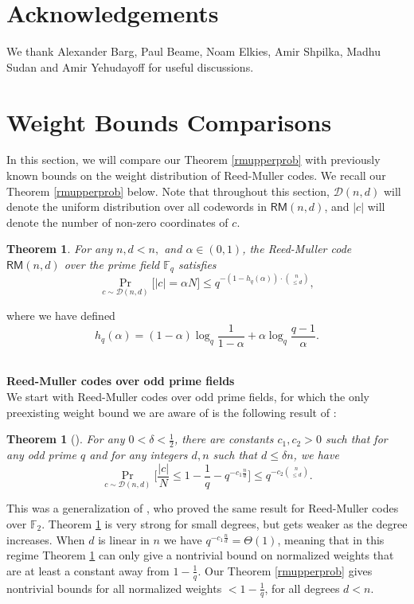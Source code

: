 \documentclass[12pt]{article}
\newtheorem{theorem}{Theorem}
\newtheorem*{theorem*}{Theorem}
\newcommand{\F}{\mathbb{F}}
\begin{document}
\section*{Acknowledgements}
We thank Alexander Barg, Paul Beame, Noam Elkies, Amir Shpilka, Madhu Sudan and Amir Yehudayoff for useful discussions.

\appendix
\section{Weight Bounds Comparisons}\label{aweight}
In this section, we will compare our Theorem \ref{rmupperprob} with previously known bounds on the weight distribution of Reed-Muller codes. We recall our Theorem \ref{rmupperprob} below. Note that throughout this section, $\mathcal{D}(n,d)$ will denote the uniform distribution over all codewords in $\mathsf{RM}(n,d)$, and $|c|$ will denote the number of non-zero coordinates of $c$.

\begin{theorem*}
For any $n,d<n,$ and $\alpha\in (0,1)$, the Reed-Muller code $\mathsf{RM}(n,d)$ over the prime field $\F_q$ satisfies
 $$ \Pr_{c\sim\mathcal{D}(n,d)}\Big[|c| = \alpha N\Big] \leq q^{-(1-h_q(\alpha))\cdot \binom{n}{\leq d}},$$
\end{theorem*}
where we have defined $$h_q(\alpha)= (1-\alpha) \log_q \frac{1}{1-\alpha} + \alpha \log_q\frac{q-1}{\alpha}.$$

\hfill\\
\textbf{Reed-Muller codes over odd prime fields}
\hfill\\
We start with Reed-Muller codes over odd prime fields, for which the only preexisting weight bound we are aware of is the following result of \cite{beame2020weightodd}:
\begin{theorem}[\cite{beame2020weightodd}]\label{oddprimes}
For any $0 < \delta < \frac{1}{2}$, there are constants $c_1, c_2>0$ such that for any
odd prime $q$ and for any integers $d,n$ such that $d \leq \delta n$, we have
$$\Pr_{c\sim \mathcal{D}(n,d)}\Big[\frac{|c|}{N} \leq 1-\frac{1}{q}-q^{-c_1\frac{n}{d}}\Big] \leq q^{-c_2\binom{n}{\leq d}}.$$
\end{theorem}
This was a generalization of \cite{ben-eliezer2012weighthalf1}, who proved the same result for Reed-Muller codes over $\F_2$. Theorem \ref{oddprimes} is very strong for small degrees, but gets weaker as the degree increases. When $d$ is linear in $n$ we have $q^{-c_1\frac{n}{d}}=\Theta(1)$, meaning that in this regime Theorem \ref{oddprimes} can only give a nontrivial bound on normalized weights that are at least a constant away from $1-\frac{1}{q}$. Our Theorem \ref{rmupperprob} gives nontrivial bounds for all normalized weights $<1-\frac{1}{q}$, for all degrees $d<n$.
\end{document}
